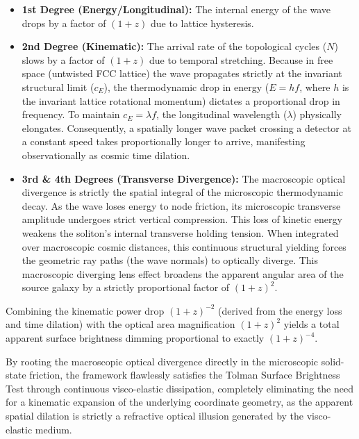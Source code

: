 \begin{itemize}
    \item \textbf{1st Degree (Energy/Longitudinal):} The internal energy of the wave drops by a factor of $(1+z)$ due to lattice hysteresis.
    \item \textbf{2nd Degree (Kinematic):} The arrival rate of the topological cycles ($N$) slows by a factor of $(1+z)$ due to temporal stretching. Because in free space (untwisted FCC lattice) the wave propagates strictly at the invariant structural limit ($c_E$), the thermodynamic drop in energy ($E = hf$, where $h$ is the invariant lattice rotational momentum) dictates a proportional drop in frequency. To maintain $c_E = \lambda f$, the longitudinal wavelength ($\lambda$) physically elongates. Consequently, a spatially longer wave packet crossing a detector at a constant speed takes proportionally longer to arrive, manifesting observationally as cosmic time dilation.
    \item \textbf{3rd \& 4th Degrees (Transverse Divergence):} The macroscopic optical divergence is strictly the spatial integral of the microscopic thermodynamic decay. As the wave loses energy to node friction, its microscopic transverse amplitude undergoes strict vertical compression. This loss of kinetic energy weakens the soliton's internal transverse holding tension. When integrated over macroscopic cosmic distances, this continuous structural yielding forces the geometric ray paths (the wave normals) to optically diverge. This macroscopic diverging lens effect broadens the apparent angular area of the source galaxy by a strictly proportional factor of $(1 + z)^2$.
\end{itemize}

Combining the kinematic power drop $(1 + z)^{-2}$ (derived from the energy loss and time dilation) with the optical area magnification $(1 + z)^2$ yields a total apparent surface brightness dimming proportional to exactly $(1 + z)^{-4}$.

By rooting the macroscopic optical divergence directly in the microscopic solid-state friction, the framework flawlessly satisfies the Tolman Surface Brightness Test through continuous visco-elastic dissipation, completely eliminating the need for a kinematic expansion of the underlying coordinate geometry, as the apparent spatial dilation is strictly a refractive optical illusion generated by the visco-elastic medium.

